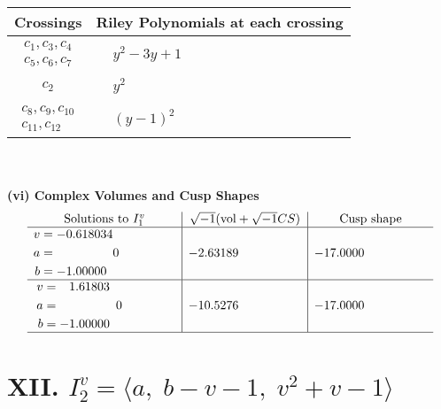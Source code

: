 \documentclass[1p]{elsarticle_modified}
\theoremstyle{definition}
\newcommand{\I}{\sqrt{-1}}
\begin{document}
\begin{tabular}{m{50pt}|m{274pt}}
Crossings & \hspace{64pt}Riley Polynomials at each crossing \\
\hline $$\begin{aligned}c_{1},c_{3},c_{4}\\c_{5},c_{6},c_{7}\end{aligned}$$&$\begin{aligned}
&y^2-3 y+1
\end{aligned}$\\
\hline $$\begin{aligned}c_{2}\end{aligned}$$&$\begin{aligned}
&y^2
\end{aligned}$\\
\hline $$\begin{aligned}c_{8},c_{9},c_{10}\\c_{11},c_{12}\end{aligned}$$&$\begin{aligned}
&(y-1)^2
\end{aligned}$\\
\hline
\end{tabular}\\~\\
\newpage\flushleft \textbf{(vi) Complex Volumes and Cusp Shapes}
$$\begin{array}{c|c|c}  
\text{Solutions to }I^v_{1}& \I (\text{vol} + \sqrt{-1}CS) & \text{Cusp shape}\\
 \hline 
\begin{aligned}
v &= -0.618034\phantom{ +0.000000I} \\
a &= \phantom{-0.000000 } 0 \\
b &= -1.00000\phantom{ +0.000000I}\end{aligned}
 & -2.63189\phantom{ +0.000000I} & -17.0000\phantom{ +0.000000I} \\ \hline\begin{aligned}
v &= \phantom{-}1.61803\phantom{ +0.000000I} \\
a &= \phantom{-0.000000 } 0 \\
b &= -1.00000\phantom{ +0.000000I}\end{aligned}
 & -10.5276\phantom{ +0.000000I} & -17.0000\phantom{ +0.000000I}\\
 \hline 
 \end{array}$$\newpage\newpage\renewcommand{\arraystretch}{1}
\centering \section*{XII. $I^v_{2}= \langle a,\;b- v-1,\;v^2+v-1 \rangle$}
\end{document}
